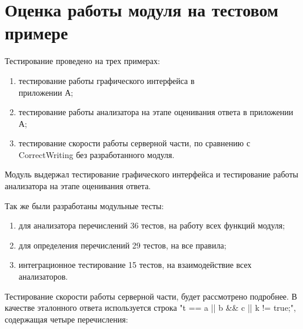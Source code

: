 \documentclass[a4paper,english,russian]{G2-105}
\begin{document}
\section{Оценка работы модуля на тестовом примере}
\par Тестирование проведено на трех примерах:
\begin{enumerate}
    \item тестирование работы графического интерфейса в \\ приложении А;
    \item тестирование работы анализатора на этапе оценивания ответа в приложении А;
    \item тестирование скорости работы серверной части, по сравнению с CorrectWriting без разработанного модуля.
\end{enumerate}
\par Модуль выдержал тестирование графического интерфейса и тестирование работы анализатора на этапе оценивания ответа. 
\par Так же были разработаны модульные тесты:
\begin{enumerate}
    \item для анализатора перечислений 36 тестов, на работу всех функций модуля;
    \item для определения перечислений 29 тестов, на все правила;
    \item интеграционное тестирование 15 тестов, на взаимодействие всех анализаторов.
\end{enumerate} 
\par Тестирование скорости работы серверной части, будет рассмотрено подробнее. В качестве эталонного ответа используется строка "t == a || b \&\& c || k != true;", содержащая четыре перечисления:
\end{document}
